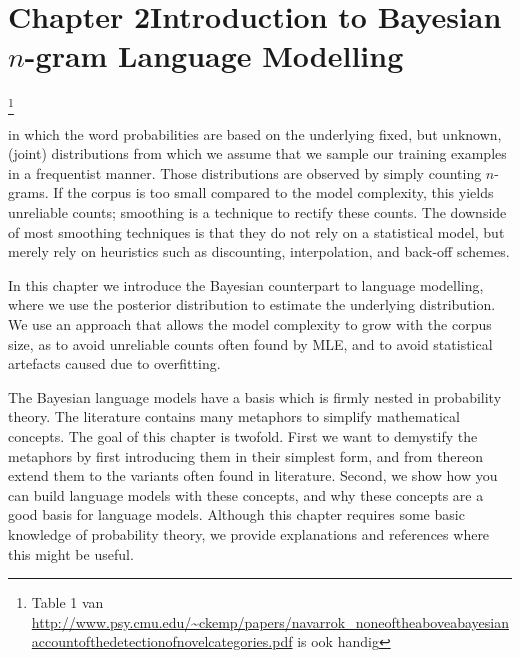 \chapter{Chapter 2\newline Introduction to Bayesian $n$-gram %
Language Modelling}\label{chap:introblm}
\footnote{Table 1 van \url{http://www.psy.cmu.edu/~ckemp/papers/navarrok_noneoftheaboveabayesianaccountofthedetectionofnovelcategories.pdf} is ook handig}

 in which the word probabilities are based on the underlying fixed, but unknown, (joint) distributions from which we assume that we sample our training examples in a frequentist manner. Those distributions are observed by simply counting $n$-grams. If the corpus is too small compared to the model complexity, this yields unreliable counts; smoothing is a technique to rectify these counts.  The downside of most smoothing techniques is that they do not rely on a statistical model, but merely rely on heuristics such as discounting, interpolation, and back-off schemes.

In this chapter we introduce the Bayesian counterpart to language modelling, where we use the posterior distribution to estimate the underlying distribution. We use an approach that allows the model complexity to grow with the corpus size, as to avoid unreliable counts often found by MLE, and to avoid statistical artefacts caused due to overfitting. 

The Bayesian language models have a basis which is firmly nested in probability theory. The literature contains many metaphors to simplify mathematical concepts. The goal of this chapter is twofold. First we want to demystify the metaphors by first introducing them in their simplest form, and from thereon extend them to the variants often found in literature. Second, we show how you can build language models with these concepts, and why these concepts are a good basis for language models. Although this chapter requires some basic knowledge of probability theory, we provide explanations and references where this might be useful.

